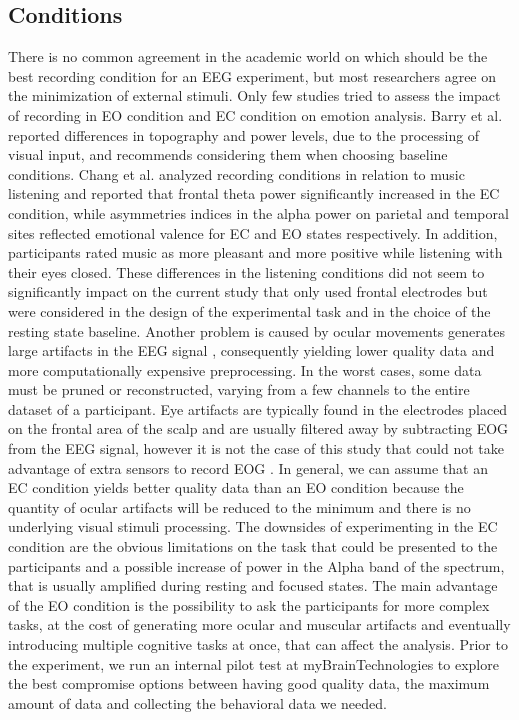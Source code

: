 \subsection{Conditions}
\label{sec:conditions}
There is no common agreement in the academic world on which should be the best recording condition for an \ac{EEG} experiment, but most researchers agree on the minimization of external stimuli. Only few studies tried to assess the impact of recording in \ac{EO} condition and \ac{EC} condition on emotion analysis. Barry et al. reported \cite{barry_eeg_2007} differences in topography and power levels, due to the processing of visual input, and recommends considering them when choosing baseline conditions. Chang et al.\cite{chang_experiencing_2015} analyzed recording conditions in relation to music listening and reported that frontal theta power significantly increased in the EC condition, while asymmetries indices in the alpha power on parietal and temporal sites reflected emotional valence for \ac{EC} and \ac{EO} states respectively. In addition, participants rated music as more pleasant and more positive while listening with their eyes closed. These differences in the listening conditions did not seem to significantly impact on the current study that only used frontal electrodes but were considered in the design of the experimental task and in the choice of the resting state baseline. Another problem is caused by ocular movements generates large artifacts in the EEG signal \cite{hagemann_effects_2001}, consequently yielding lower quality data and more computationally expensive preprocessing. In the worst cases, some data must be pruned or reconstructed, varying from a few channels to the entire dataset of a participant. Eye artifacts are typically found in the electrodes placed on the frontal area of the scalp and are usually filtered away by subtracting \ac{EOG} from the \ac{EEG} signal, however it is not the case of this study that could not take advantage of extra sensors to record \ac{EOG} . In general, we can assume that an \ac{EC} condition yields better quality data than an \ac{EO} condition because the quantity of ocular artifacts will be reduced to the minimum and there is no underlying visual stimuli processing. The downsides of experimenting in the \ac{EC} condition are the obvious limitations on the task that could be presented to the participants and a possible increase of power in the Alpha band of the spectrum, that is usually amplified during resting and focused states. The main advantage of the \ac{EO} condition is the possibility to ask the participants for more complex tasks, at the cost of generating more ocular and muscular artifacts and eventually introducing multiple cognitive tasks at once, that can affect the analysis. Prior to the experiment, we run an internal pilot test at myBrainTechnologies to explore the best compromise options between having good quality data, the maximum amount of data and collecting the behavioral data we needed.
